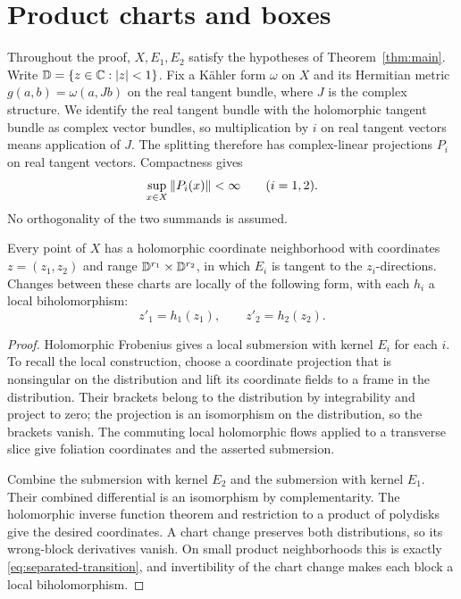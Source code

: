 \section{Product charts and boxes}\label{sec:prelim}

Throughout the proof, $X,E_1,E_2$ satisfy the hypotheses of
Theorem~\ref{thm:main}. Write $\mathbb D=\{z\in\mathbb C:|z|<1\}$.
Fix a K\"ahler form $\omega$ on $X$ and its Hermitian metric
$g(a,b)=\omega(a,Jb)$ on the real tangent bundle, where $J$ is the
complex structure. We identify the real tangent bundle with the
holomorphic tangent bundle as complex vector bundles, so multiplication
by $i$ on real tangent vectors means application of $J$. The splitting
therefore has complex-linear projections $P_i$ on real tangent vectors.
Compactness gives
\begin{equation}\label{eq:projection-bounds}
\sup_{x\in X}\left\lVert P_i(x)\right\rVert<\infty\qquad(i=1,2).
\end{equation}
No orthogonality of the two summands is assumed.

\begin{lemma}\label{lem:product-charts}
Every point of $X$ has a holomorphic coordinate neighborhood with
coordinates $z=(z_1,z_2)$ and range $\mathbb D^{r_1}\times\mathbb D^{r_2}$, in
which $E_i$ is tangent to the $z_i$-directions. Changes between these
charts are locally of the following form, with each $h_i$ a local
biholomorphism:
\begin{equation}\label{eq:separated-transition}
z'_1=h_1(z_1),\qquad z'_2=h_2(z_2).
\end{equation}
\end{lemma}

\begin{proof}
Holomorphic Frobenius gives a local submersion with kernel $E_i$ for
each $i$. To recall the local construction, choose a coordinate
projection that is nonsingular on the distribution and lift its
coordinate fields to a frame in the distribution. Their brackets
belong to the distribution by integrability and project to zero;
the projection is an isomorphism on the distribution, so the brackets
vanish. The commuting local holomorphic flows applied to a transverse
slice give foliation coordinates and the asserted submersion.

Combine the submersion with kernel $E_2$ and the submersion with kernel
$E_1$. Their combined differential is an isomorphism by complementarity.
The holomorphic inverse function theorem and restriction to a product
of polydisks give the desired coordinates. A chart change preserves
both distributions, so its wrong-block derivatives vanish. On small
product neighborhoods this is exactly
\eqref{eq:separated-transition}, and invertibility of the chart change
makes each block a local biholomorphism.
\end{proof}

